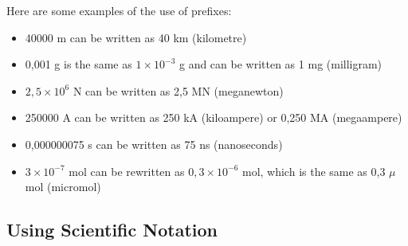       \label{m30853*id66297}Here are some examples of the use of prefixes:\par 
      \label{m30853*id66300}\begin{itemize}[noitemsep]
            \label{m30853*uid33}\item 40000 m can be written as 40 km (kilometre)
\label{m30853*uid34}\item 0,001 g is the same as \begin{math}1\ensuremath{\times}{10}^{-3}\end{math} g and can be written as 1 mg (milligram)
\label{m30853*uid35}\item \begin{math}2,5\ensuremath{\times}{10}^{6}\end{math} N can be written as 2,5 MN (meganewton)
\label{m30853*uid36}\item 250000 A can be written as 250 kA (kiloampere) or 0,250 MA (megaampere)
\label{m30853*uid37}\item 0,000000075 s can be written as 75 ns (nanoseconds)
\label{m30853*uid38}\item \begin{math}3\ensuremath{\times}{10}^{-7}\end{math} mol can be rewritten as \begin{math}0,3\ensuremath{\times}{10}^{-6}\end{math} mol, which is the same as 0,3 \begin{math}\mu \end{math}mol (micromol)
\end{itemize}
        
\label{m30853*secfhsst!!!underscore!!!id1016}
            \subsection{  Using Scientific Notation }
            \nopagebreak
            
